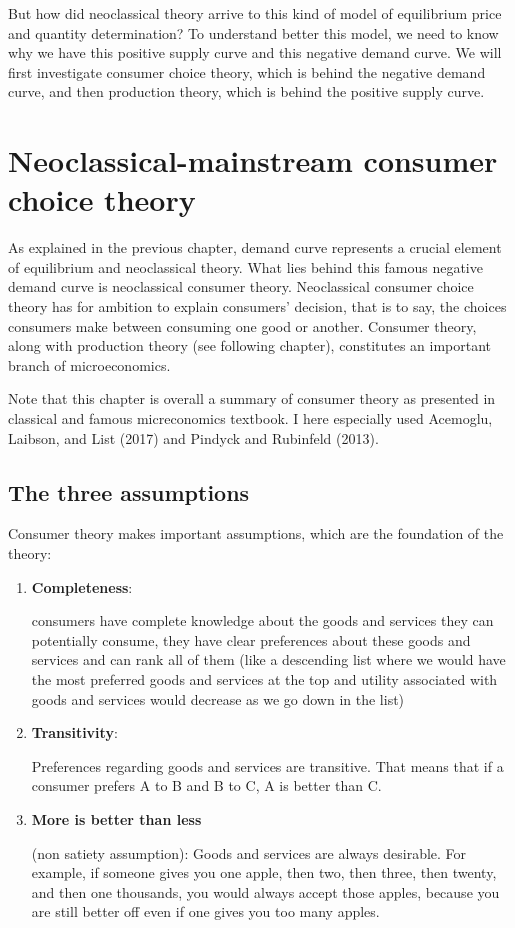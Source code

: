 \documentclass[
  letterpaper,
  DIV=11,
  numbers=noendperiod]{scrreprt}
\begin{document}
But how did neoclassical theory arrive to this kind of model of
equilibrium price and quantity determination? To understand better this
model, we need to know why we have this positive supply curve and this
negative demand curve. We will first investigate consumer choice theory,
which is behind the negative demand curve, and then production theory,
which is behind the positive supply curve.

\hypertarget{neoclassical-mainstream-consumer-choice-theory}{%
\chapter{Neoclassical-mainstream consumer choice
theory}\label{neoclassical-mainstream-consumer-choice-theory}}

As explained in the previous chapter, demand curve represents a crucial
element of equilibrium and neoclassical theory. What lies behind this
famous negative demand curve is neoclassical consumer theory.
Neoclassical consumer choice theory has for ambition to explain
consumers' decision, that is to say, the choices consumers make between
consuming one good or another. Consumer theory, along with production
theory (see following chapter), constitutes an important branch of
microeconomics.

Note that this chapter is overall a summary of consumer theory as
presented in classical and famous micreconomics textbook. I here
especially used Acemoglu, Laibson, and List (2017) and Pindyck and
Rubinfeld (2013).

\hypertarget{the-three-assumptions}{%
\section{The three assumptions}\label{the-three-assumptions}}

Consumer theory makes important assumptions, which are the foundation of
the theory:

\begin{enumerate}
\def\labelenumi{\arabic{enumi}.}
\item
  \textbf{Completeness}:

  consumers have complete knowledge about the goods and services they
  can potentially consume, they have clear preferences about these goods
  and services and can rank all of them (like a descending list where we
  would have the most preferred goods and services at the top and
  utility associated with goods and services would decrease as we go
  down in the list)
\item
  \textbf{Transitivity}:

  Preferences regarding goods and services are transitive. That means
  that if a consumer prefers A to B and B to C, A is better than C.
\item
  \textbf{More is better than less}

  (non satiety assumption): Goods and services are always desirable. For
  example, if someone gives you one apple, then two, then three, then
  twenty, and then one thousands, you would always accept those apples,
  because you are still better off even if one gives you too many
  apples.
\end{enumerate}
\end{document}
